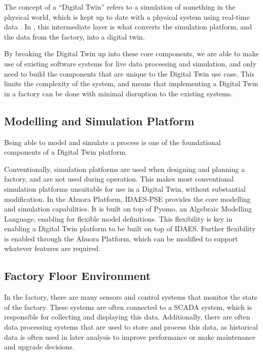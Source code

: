 The concept of a “Digital Twin” refers to a simulation of something in the physical world, which is kept up to date with a physical system using real-time data \cite{yu2022energy}.
In , this intermediate layer is what converts the simulation platform, and the data from the factory, into a digital twin. 

By breaking the Digital Twin up into these core components, we are able to make use of existing software systems for live data processing and simulation, and only need to build the components that are unique to the Digital Twin use case. This limits the complexity of the system, and means that implementing a Digital Twin in a factory can be done with minimal disruption to the existing systems.


\subsection{Modelling and Simulation Platform}


Being able to model and simulate a process is one of the foundational components of a Digital Twin platform. 

Conventionally, simulation platforms are used when designing and planning a factory, and are not used during operation. This makes most conventional simulation platforms unsuitable for use in a Digital Twin, without substantial modification.
In the Ahuora Platform, IDAES-PSE provides the core modelling and simulation capabilities. 
It is built on top of Pyomo, an Algebraic Modelling Language, enabling for flexible model definitions.
This flexibility is key in enabling a Digital Twin platform to be built on top of IDAES. 
Further flexibility is enabled through the Ahuora Platform, which can be modified to support whatever features are required.

\subsection{Factory Floor Environment}

In the factory, there are many sensors and control systems that monitor the state of the factory. These systems are often connected to a SCADA system, which is responsible for collecting and displaying this data.
Additionally, there are often data processing systems that are used to store and process this data, as historical data is often used in later analysis to improve performance or make maintenance and upgrade decisions.

